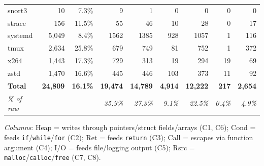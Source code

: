 \begin{table}[t]
\begin{tabular}{lrrrrrrrr}
  snort3 & 10 & 7.3\% & 9 & 1 & 0 & 0 & 0 & 0 \\
  strace & 156 & 11.5\% & 55 & 46 & 10 & 28 & 0 & 17 \\
  systemd & 5,049 & 8.4\% & 1562 & 1385 & 928 & 1057 & 1 & 116 \\
  tmux & 2,634 & 25.8\% & 679 & 749 & 81 & 752 & 1 & 372 \\
  x264 & 1,443 & 17.3\% & 729 & 313 & 19 & 294 & 19 & 69 \\
  zstd & 1,470 & 16.6\% & 445 & 446 & 103 & 373 & 11 & 92 \\
\midrule
  \textbf{Total} & \textbf{24,809} & \textbf{16.1\%} & \textbf{19,474} & \textbf{14,789} & \textbf{4,914} & \textbf{12,222} & \textbf{217} & \textbf{2,654} \\
  \textit{\% of raw} &  &  & \textit{35.9\%} & \textit{27.3\%} & \textit{9.1\%} & \textit{22.5\%} & \textit{0.4\%} & \textit{4.9\%} \\
\bottomrule
\end{tabular}
\vspace{1mm}
\footnotesize
\textit{Columns}: Heap = writes through pointers/struct fields/arrays (C1, C6); Cond = feeds \texttt{if}/\texttt{while}/\texttt{for} (C2); Ret = feeds \texttt{return} (C3); Call = escapes via function argument (C4); I/O = feeds file/logging output (C5); Rsrc = \texttt{malloc}/\texttt{calloc}/\texttt{free} (C7, C8).
\end{table}